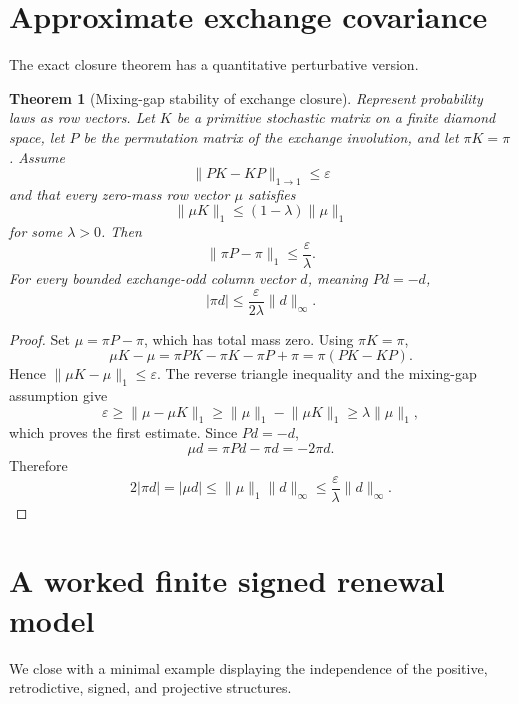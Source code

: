 \documentclass[11pt]{article}
\newtheorem{theorem}{Theorem}[section]
\theoremstyle{definition}
\theoremstyle{remark}
\newcommand{\norm}[1]{\lVert#1\rVert}
\newcommand{\eps}{\varepsilon}
\begin{document}
\section{Approximate exchange covariance}
\label{app:approx-exchange}

The exact closure theorem has a quantitative perturbative version.

\begin{theorem}[Mixing-gap stability of exchange closure]
\label{thm:approx-exchange}
Represent probability laws as row vectors.  Let $K$ be a primitive stochastic
matrix on a finite diamond space, let $P$ be the permutation matrix of the
exchange involution, and let $\pi K=\pi$.  Assume
\[
 \norm{PK-KP}_{1\to1}\le\eps
\]
and that every zero-mass row vector $\mu$ satisfies
\[
 \norm{\mu K}_1\le(1-\lambda)\norm{\mu}_1
\]
for some $\lambda>0$.  Then
\[
 \norm{\pi P-\pi}_1\le\frac{\eps}{\lambda}.
\]
For every bounded exchange-odd column vector $d$, meaning $Pd=-d$,
\[
 |\pi d|\le\frac{\eps}{2\lambda}\norm{d}_\infty.
\]
\end{theorem}

\begin{proof}
Set $\mu=\pi P-\pi$, which has total mass zero.  Using $\pi K=\pi$,
\[
 \mu K-\mu
 =\pi PK-\pi K-\pi P+\pi
 =\pi(PK-KP).
\]
Hence $\norm{\mu K-\mu}_1\le\eps$.  The reverse triangle inequality and the
mixing-gap assumption give
\[
 \eps\ge\norm{\mu-\mu K}_1
 \ge\norm{\mu}_1-\norm{\mu K}_1
 \ge\lambda\norm{\mu}_1,
\]
which proves the first estimate.  Since $Pd=-d$,
\[
 \mu d=\pi Pd-\pi d=-2\pi d.
\]
Therefore
\[
 2|\pi d|=|\mu d|
 \le\norm{\mu}_1\norm{d}_\infty
 \le\frac{\eps}{\lambda}\norm{d}_\infty.
\]
\end{proof}

\section{A worked finite signed renewal model}
\label{app:worked-model}

We close with a minimal example displaying the independence of the positive,
retrodictive, signed, and projective structures.
\end{document}
